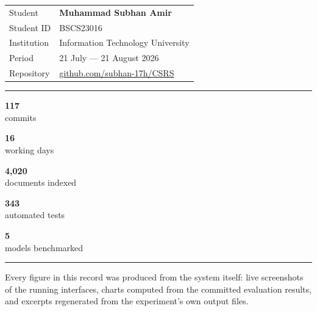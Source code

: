\documentclass[11pt,a4paper]{article}
\newcommand{\statcell}[2]{%
  \begin{minipage}[t]{0.19\textwidth}
    \centering
    {\color{accent}\bfseries\Large #1}\\[1pt]
    {\footnotesize\color{soft} #2}
  \end{minipage}%
}
\begin{document}
\thispagestyle{empty}

\vspace*{85mm}

\begin{tabularx}{\textwidth}{@{}l X@{}}
  {\color{soft}\small Student}     & \textbf{Muhammad Subhan Amir} \\
  {\color{soft}\small Student ID}  & BSCS23016 \\
  {\color{soft}\small Institution} & Information Technology University \\
  {\color{soft}\small Period}      & 21 July --- 21 August 2026 \\
  {\color{soft}\small Repository}  & \href{https://github.com/subhan-17h/CSRS}{github.com/subhan-17h/CSRS} \\
\end{tabularx}

\vspace{16mm}

\noindent\textcolor{rulegrey}{\rule{\textwidth}{0.6pt}}

\vspace{6mm}

\noindent
\statcell{117}{commits}\hfill
\statcell{16}{working days}\hfill
\statcell{4{,}020}{documents indexed}\hfill
\statcell{343}{automated tests}\hfill
\statcell{5}{models benchmarked}

\vspace{6mm}

\noindent\textcolor{rulegrey}{\rule{\textwidth}{0.6pt}}

\vfill

{\footnotesize\color{soft}
Every figure in this record was produced from the system itself: live screenshots of
the running interfaces, charts computed from the committed evaluation results, and
excerpts regenerated from the experiment's own output files.
\par}
\end{document}
